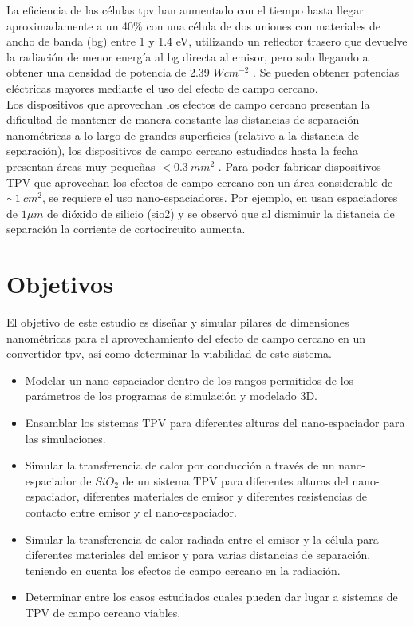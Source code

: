 La eficiencia de las células \acrshort{tpv} han aumentado con el tiempo hasta llegar aproximadamente a un 40\% con una célula de dos uniones con materiales de ancho de banda (\acrshort{bg}) entre 1 y 1.4 eV, utilizando un reflector trasero que devuelve la radiación de menor energía al \acrshort{bg} directa al emisor, pero solo llegando a obtener una densidad de potencia de 2.39 $W{cm}^{-2}$ \cite{ThermalConductivity_SiO2_2018}. Se pueden obtener potencias eléctricas mayores mediante el uso del efecto de campo cercano.\\

Los dispositivos que aprovechan los efectos de campo cercano presentan la dificultad de mantener de manera constante las distancias de separación nanométricas a lo largo de grandes superficies (relativo a la distancia de separación), los dispositivos de campo cercano estudiados hasta la fecha presentan áreas muy pequeñas $<0.3 \ mm^2$ \cite{inoue_one-chip_2019_0_3mm2}. Para poder fabricar dispositivos TPV que aprovechan los efectos de campo cercano con un área considerable de $\sim 1 \ cm^2$, se requiere el uso nano-espaciadores. Por ejemplo, en \cite{doi:MicroGapTPV} usan espaciadores de $1\mu m$ de dióxido de silicio (\gls{sio2}) y se observó que al disminuir la distancia de separación la corriente de cortocircuito aumenta.


\section{Objetivos}
El objetivo de este estudio es diseñar y simular pilares de dimensiones nanométricas para el aprovechamiento del efecto de campo cercano en un convertidor \acrshort{tpv}, así como determinar la viabilidad de este sistema. 
\begin{itemize}
	\item Modelar un nano-espaciador dentro de los rangos permitidos de los parámetros de los programas de simulación y modelado 3D.
	\item Ensamblar los sistemas TPV para diferentes alturas del nano-espaciador para las simulaciones.
	\item Simular la transferencia de calor por conducción a través de un nano-espaciador de $SiO_2$ de un sistema TPV para diferentes alturas del nano-espaciador, diferentes materiales de emisor y diferentes resistencias de contacto entre emisor y el nano-espaciador.
	\item Simular la transferencia de calor radiada entre el emisor y la célula para diferentes materiales del emisor y para varias distancias de separación, teniendo en cuenta los efectos de campo cercano en la radiación.
	\item Determinar entre los casos estudiados cuales pueden dar lugar a sistemas de TPV de campo cercano viables.
\end{itemize}

